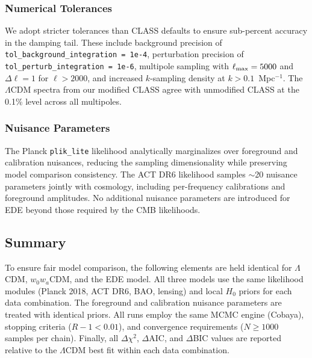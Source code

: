 \documentclass[a4paper,11pt]{article}
\begin{document}
\subsubsection{Numerical Tolerances}
We adopt stricter tolerances than CLASS defaults to ensure sub-percent accuracy in the damping tail. These include background precision of \texttt{tol\_background\_integration = 1e-4}, perturbation precision of \texttt{tol\_perturb\_integration = 1e-6}, multipole sampling with $\ell_{\rm max} = 5000$ and $\Delta\ell = 1$ for $\ell > 2000$, and increased $k$-sampling density at $k > 0.1$~Mpc$^{-1}$. The $\Lambda$CDM spectra from our modified CLASS agree with unmodified CLASS at the 0.1\% level across all multipoles.

\subsubsection{Nuisance Parameters}
The Planck \texttt{plik\_lite} likelihood analytically marginalizes over foreground and calibration nuisances, reducing the sampling dimensionality while preserving model comparison consistency. The ACT DR6 likelihood samples $\sim$20 nuisance parameters jointly with cosmology, including per-frequency calibrations and foreground amplitudes. No additional nuisance parameters are introduced for EDE beyond those required by the CMB likelihoods.


\subsection{Summary}
\label{sec:fairness}

To ensure fair model comparison, the following elements are held identical for $\Lambda$CDM, $w_0 w_a$CDM, and the EDE model. All three models use the same likelihood modules (Planck 2018, ACT DR6, BAO, lensing) and local $H_0$ priors for each data combination. The foreground and calibration nuisance parameters are treated with identical priors. All runs employ the same MCMC engine (Cobaya), stopping criteria ($R - 1 < 0.01$), and convergence requirements ($N \geq 1000$ samples per chain). Finally, all $\Delta\chi^2$, $\Delta$AIC, and $\Delta$BIC values are reported relative to the $\Lambda$CDM best fit within each data combination.

\end{document}
